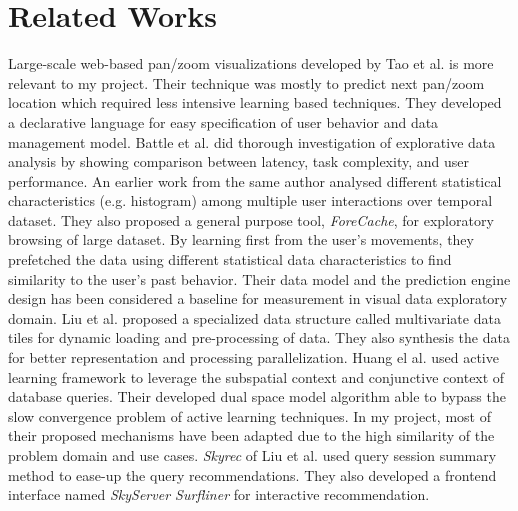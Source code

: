 \section{Related Works}
\label{sec:background}
Large-scale web-based pan/zoom visualizations developed by Tao et al.\cite{tao2019kyrix} is more relevant to my project. Their technique was mostly to
predict next pan/zoom location which required less intensive learning based techniques. They developed a declarative language for easy specification of user
behavior and data management model. Battle et al.\cite{battle2019role} did thorough investigation of explorative data analysis by showing comparison between
latency, task complexity, and user performance. An earlier work\cite{battle2014dynamic} from the same author analysed different statistical characteristics
(e.g. histogram) among multiple user interactions over temporal dataset. They also proposed a general purpose tool, \emph{ForeCache}\cite{battle2016dynamic},
for exploratory browsing of large dataset. By learning first from the user's movements, they prefetched the data using different statistical data
characteristics to find similarity to the user's past behavior. Their data model and the prediction engine design has been considered a baseline for
measurement in visual data exploratory domain. Liu et al.\cite{liu2013immens} proposed a specialized data structure called multivariate data tiles for
dynamic loading and pre-processing of data. They also synthesis the data for better representation and processing parallelization. Huang el al.
\cite{huang2018optimization} \cite{huang2019aideme} used active learning framework to leverage the subspatial context and conjunctive context of database queries. Their
developed
dual space model algorithm able to bypass the slow convergence problem of active learning techniques. In my project, most of their proposed mechanisms have
been adapted due to the high similarity of the problem domain and use cases. \emph{Skyrec}\cite{liu2019improvement} of Liu et al. used query session summary
method to ease-up the query recommendations. They also developed a frontend interface named \emph{SkyServer Surfliner} for interactive recommendation.